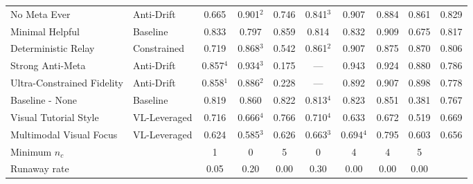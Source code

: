 \begin{table}[t]
{\begin{tabular}{llcccccccc}
No Meta Ever & Anti-Drift & 0.665 & 0.901$^{2}$ & 0.746 & 0.841$^{3}$ & 0.907 & 0.884 & 0.861 & 0.829 \\
Minimal Helpful & Baseline & 0.833 & 0.797 & 0.859 & 0.814 & 0.832 & 0.909 & 0.675 & 0.817 \\
Deterministic Relay & Constrained & 0.719 & 0.868$^{3}$ & 0.542 & 0.861$^{2}$ & 0.907 & 0.875 & 0.870 & 0.806 \\
Strong Anti-Meta & Anti-Drift & 0.857$^{4}$ & 0.934$^{3}$ & 0.175 & --- & 0.943 & 0.924 & 0.880 & 0.786 \\
Ultra-Constrained Fidelity & Anti-Drift & 0.858$^{1}$ & 0.886$^{2}$ & 0.228 & --- & 0.892 & 0.907 & 0.898 & 0.778 \\
Baseline - None & Baseline & 0.819 & 0.860 & 0.822 & 0.813$^{4}$ & 0.823 & 0.851 & 0.381 & 0.767 \\
Visual Tutorial Style & VL-Leveraged & 0.716 & 0.666$^{4}$ & 0.766 & 0.710$^{4}$ & 0.633 & 0.672 & 0.519 & 0.669 \\
Multimodal Visual Focus & VL-Leveraged & 0.624 & 0.585$^{3}$ & 0.626 & 0.663$^{3}$ & 0.694$^{4}$ & 0.795 & 0.603 & 0.656 \\
\midrule
\multicolumn{2}{l}{Minimum $n_c$} & 1 & 0 & 5 & 0 & 4 & 4 & 5 & \\
\multicolumn{2}{l}{Runaway rate} & 0.05 & 0.20 & 0.00 & 0.30 & 0.00 & 0.00 & 0.00 & \\
\bottomrule
\end{tabular}}
\end{table}

